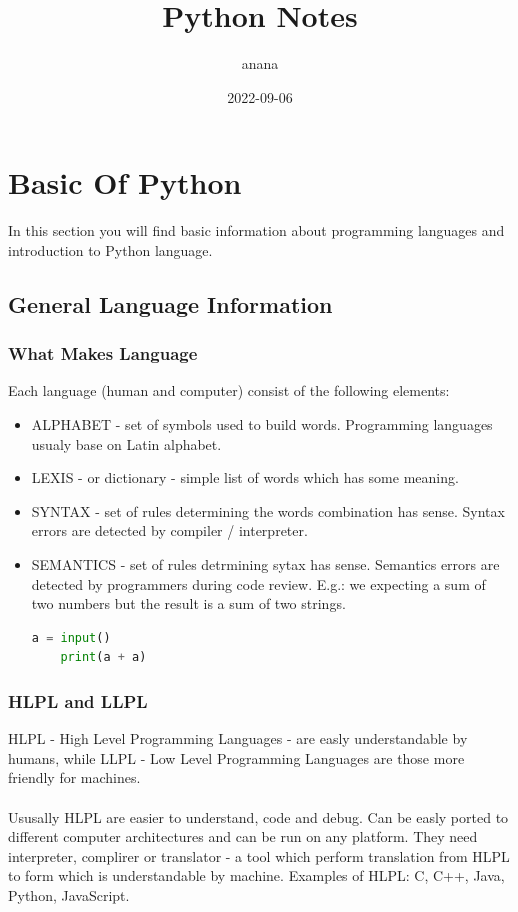\documentclass{article}
\title{Python Notes}
\author{anana}
\date{2022-09-06}
\begin{document}
	\maketitle

	\newpage
	\tableofcontents
	
	\newpage
	\section{Basic Of Python}
	In this section you will find basic information about programming languages and introduction to Python language.
	\subsection{General Language Information}
	\subsubsection{What Makes Language}
	Each language (human and computer) consist of the following elements:
	\begin{itemize}
	\item ALPHABET - set of symbols used to build words. Programming languages usualy base on Latin alphabet.
	\item LEXIS - or dictionary - simple list of words which has some meaning.
	\item SYNTAX - set of rules determining the words combination has sense. Syntax errors are detected by compiler / interpreter.
	\item SEMANTICS - set of rules detrmining sytax has sense. Semantics errors are detected by programmers during code review. E.g.: we expecting a sum of two numbers but the result is a sum of two strings.
	\begin{lstlisting}[language=Python]
	a = input()
	print(a + a)
	\end{lstlisting}
	\end{itemize}
	\subsubsection{HLPL and LLPL}
	HLPL - High Level Programming Languages - are easly understandable by humans, while LLPL - Low Level Programming Languages are those more friendly for machines. 
	\paragraph{}
	Ususally HLPL are easier to understand, code and debug. Can be easly ported to different computer architectures and can be run on any platform. They need interpreter, complirer or translator - a tool which perform translation from HLPL to form which is understandable by machine. Examples of HLPL: C, C++, Java, Python, JavaScript.
\end{document}

